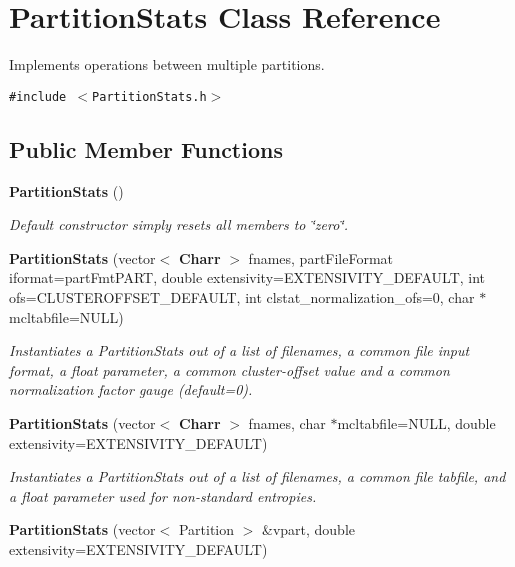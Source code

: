\section{Partition\-Stats Class Reference}
\label{classPartitionStats}
Implements operations between multiple partitions.  


{\tt \#include $<$Partition\-Stats.h$>$}

\subsection*{Public Member Functions}
\begin{CompactItemize}
\item 
{\bf Partition\-Stats} ()\label{classPartitionStats_a0}

\begin{CompactList}\small\item\em Default constructor simply resets all members to \char`\"{}zero\char`\"{}. \item\end{CompactList}\item 
{\bf Partition\-Stats} (vector$<$ {\bf Charr} $>$ fnames, part\-File\-Format iformat=part\-Fmt\-PART, double extensivity=EXTENSIVITY\_\-DEFAULT, int ofs=CLUSTEROFFSET\_\-DEFAULT, int clstat\_\-normalization\_\-ofs=0, char $\ast$mcltabfile=NULL)\label{classPartitionStats_a1}

\begin{CompactList}\small\item\em Instantiates a Partition\-Stats out of a list of filenames, a common file input format, a float parameter, a common cluster-offset value and a common normalization factor gauge (default=0). \item\end{CompactList}\item 
{\bf Partition\-Stats} (vector$<$ {\bf Charr} $>$ fnames, char $\ast$mcltabfile=NULL, double extensivity=EXTENSIVITY\_\-DEFAULT)\label{classPartitionStats_a2}

\begin{CompactList}\small\item\em Instantiates a Partition\-Stats out of a list of filenames, a common file tabfile, and a float parameter used for non-standard entropies. \item\end{CompactList}\item 
{\bf Partition\-Stats} (vector$<$ Partition $>$ \&vpart, double extensivity=EXTENSIVITY\_\-DEFAULT)\label{classPartitionStats_a3}


\end{CompactItemize}
